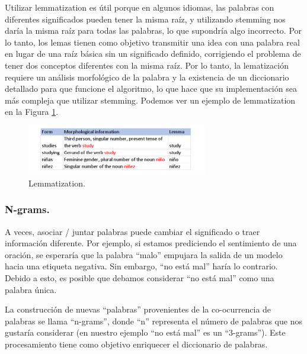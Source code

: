 \documentclass[12pt,a4paper]{article}
\begin{document}
\begin{sloppypar}
\begin{itemize}
Utilizar lemmatization es útil porque en algunos idiomas, las palabras con diferentes significados pueden tener la misma raíz, y utilizando stemming nos daría la misma raíz para todas las palabras, lo que supondría algo incorrecto. Por lo tanto, los lemas tienen como objetivo transmitir una idea con una palabra real en lugar de una raíz básica sin un significado definido, corrigiendo el problema de tener dos conceptos diferentes con la misma raíz. Por lo tanto, la lematización requiere un análisis morfológico de la palabra y la existencia de un diccionario detallado para que funcione el algoritmo, lo que hace que su implementación sea más compleja que utilizar stemming. Podemos ver un ejemplo de lemmatization en la Figura \ref{fig:Imagen_NLP_5}.

\begin{figure}[H]    
 \centering
 \includegraphics[width=0.7\textwidth]{images/NLP/5.png}
 \caption{Lemmatization\cite{NLP_2}.}
 \label{fig:Imagen_NLP_5}
\end{figure}

\end{itemize}

\cleardoublepage

\subsubsection{N-grams.}\label{ngrams}

A veces, asociar / juntar palabras puede cambiar el significado o traer información diferente. Por ejemplo, si estamos prediciendo el sentimiento de una oración, se esperaría que la palabra ``malo'' empujara la salida de un modelo hacia una etiqueta negativa. Sin embargo, ``no está mal'' haría lo contrario. Debido a esto, es posible que debamos considerar ``no está mal'' como una palabra única. 

La construcción de nuevas ``palabras'' provenientes de la co-ocurrencia de palabras se llama ``n-grams'', donde ``n'' representa el número de palabras que nos gustaría considerar (en nuestro ejemplo ``no está mal'' es un ``3-grams''). Este procesamiento tiene como objetivo enriquecer el diccionario de palabras\cite{NLP_2}.
\\


\end{sloppypar}
\end{document}
